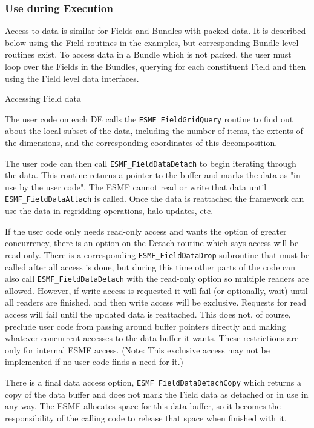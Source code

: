 \subsubsection{Use during Execution}

Access to data is similar for Fields and Bundles with
packed data.  It is described below using the Field
routines in the examples, but corresponding Bundle level
routines exist.  To access data in a
Bundle which is not packed, the user must loop over the
Fields in the Bundles, querying for each
constituent Field and then using the Field level data interfaces.

\begin{description}

\item{Accessing Field data}

The user code on each DE calls the {\tt ESMF\_FieldGridQuery}
routine to find out about the local subset of the data, including
the number of items, the extents
of the dimensions, and the corresponding coordinates of this
decomposition.

The user code can then call {\tt ESMF\_FieldDataDetach} to
begin iterating through the data.  This routine returns a
pointer to the buffer and marks the data as "in use by
the user code".  The ESMF cannot read or write that
data until {\tt ESMF\_FieldDataAttach} is called.  Once the data
is reattached the framework can use the data in regridding 
operations, halo updates, etc.  

If the user code only needs read-only access and wants
the option of greater concurrency, there is an option on the
Detach routine which says access will be read only.  There is
a corresponding {\tt ESMF\_FieldDataDrop} subroutine that must be called
after all access is done, but during this time other parts of
the code can also call {\tt ESMF\_FieldDataDetach} with the read-only
option so multiple readers are allowed.  However, if write access
is requested it will fail (or optionally, wait) until all readers 
are finished, and
then write access will be exclusive.   Requests for read access
will fail until the updated data is reattached. 
This does not, of course, preclude user code from passing around
buffer pointers directly and making whatever concurrent accesses to the
data buffer it wants.  These restrictions are only for internal
ESMF access.
(Note: This exclusive access may not be implemented if no user
code finds a need for it.)

There is a final data access option, {\tt ESMF\_FieldDataDetachCopy}
which returns a copy of the data buffer and does not mark the
Field data as detached or in use in any way.  The ESMF 
allocates space for this data buffer, so it becomes the
responsibility of the calling code to release that space 
when finished with it.

\end{description}


